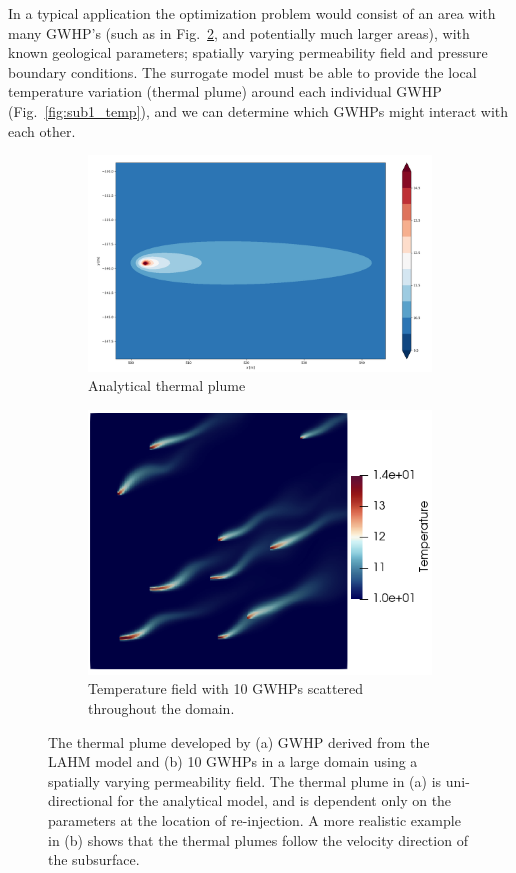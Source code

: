 \documentclass{article} %
\begin{document}
In a typical application the optimization problem would consist of an area with many GWHP's (such as in Fig.~\ref{large_example}, and potentially much larger areas), with known geological parameters; spatially varying permeability field and pressure boundary conditions. 
The surrogate model must be able to provide the local temperature variation (thermal plume) around each individual GWHP (Fig.~\ref{fig:sub1_temp}), and we can determine which GWHPs might interact with each other.

\begin{figure}[!htb]
\centering
\begin{subfigure}{.5\textwidth}
  \centering
  \includegraphics[width=.8\linewidth]{analyticalPlume.png}
  \caption{Analytical thermal plume}
  \label{analyticalPlume}
\end{subfigure}%
\begin{subfigure}{.5\textwidth}
  \centering
  \includegraphics[width=.8\linewidth]{large_temp_example_2.png}
  \caption{Temperature field with 10 GWHPs scattered throughout the domain.}
  \label{large_example}
\end{subfigure}
\caption{The thermal plume developed by (a) GWHP derived from the LAHM model \citep{Pophillat2020} and (b) 10 GWHPs in a large domain using a spatially varying permeability field. The thermal plume in (a) is uni-directional for the analytical model, and is dependent only on the parameters at the location of re-injection. A more realistic example in (b) shows that the thermal plumes follow the velocity direction of the subsurface.}
\label{fig:plume_and_overview}
\end{figure}
\end{document}
